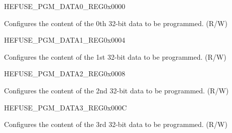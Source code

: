 \begin{register}{H}{EFUSE\_PGM\_DATA0\_REG}{0x0000}\label{regdesc:EFUSEPGMDATA0REG}
%
\regnewline%
\begin{regdesc}\begin{reglist}
\label{fielddesc:EFUSEPGMDATA0}\item [EFUSE\_PGM\_DATA\_0] Configures the content of the 0th 32-bit data to be programmed. (R/W)
\end{reglist}\end{regdesc}
\end{register}


\begin{register}{H}{EFUSE\_PGM\_DATA1\_REG}{0x0004}\label{regdesc:EFUSEPGMDATA1REG}
%
\regnewline%
\begin{regdesc}\begin{reglist}
\label{fielddesc:EFUSEPGMDATA1}\item [EFUSE\_PGM\_DATA\_1] Configures the content of the 1st 32-bit data to be programmed. (R/W)
\end{reglist}\end{regdesc}
\end{register}


\begin{register}{H}{EFUSE\_PGM\_DATA2\_REG}{0x0008}\label{regdesc:EFUSEPGMDATA2REG}
%
\regnewline%
\begin{regdesc}\begin{reglist}
\label{fielddesc:EFUSEPGMDATA2}\item [EFUSE\_PGM\_DATA\_2] Configures the content of the 2nd 32-bit data to be programmed. (R/W)
\end{reglist}\end{regdesc}
\end{register}


\begin{register}{H}{EFUSE\_PGM\_DATA3\_REG}{0x000C}\label{regdesc:EFUSEPGMDATA3REG}
%
\regnewline%
\begin{regdesc}\begin{reglist}
\label{fielddesc:EFUSEPGMDATA3}\item [EFUSE\_PGM\_DATA\_3] Configures the content of the 3rd 32-bit data to be programmed. (R/W)
\end{reglist}\end{regdesc}
\end{register}


